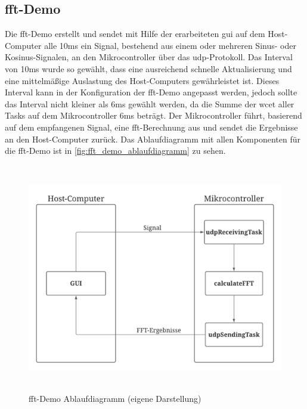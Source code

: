 \documentclass[../EDF Master Thesis.tex]{subfiles}
\begin{document}
    \clearpage

    \subsection{\acf{fft}-Demo} \label{section:fft_demo}

        Die \ac{fft}-Demo erstellt und sendet mit Hilfe der erarbeiteten \ac{gui} auf dem Host-Computer alle 10ms ein Signal, bestehend aus einem oder mehreren Sinus- oder Kosinus-Signalen, an den Mikrocontroller über das \ac{udp}-Protokoll.
        Das Interval von 10ms wurde so gewählt, dass eine ausreichend schnelle Aktualisierung und eine mittelmäßige Auslastung des Host-Computers gewährleistet ist.
        Dieses Interval kann in der Konfiguration der \ac{fft}-Demo angepasst werden, jedoch sollte das Interval nicht kleiner als 6ms gewählt werden, da die Summe der \ac{wcet} aller Tasks auf dem Mikrocontroller 6ms beträgt.
        Der Mikrocontroller führt, basierend auf dem empfangenen Signal, eine \ac{fft}-Berechnung aus und sendet die Ergebnisse an den Host-Computer zurück.
        Das Ablaufdiagramm mit allen Komponenten für die \ac{fft}-Demo ist in \autoref{fig:fft_demo_ablaufdiagramm} zu sehen.

        \begin{figure}[H]
            \centering
            \includegraphics[height=10cm, width=14cm]{./attachments/FFT Ablauf.pdf}
            \caption[\ac{fft}-Demo Ablaufdiagramm]{\ac{fft}-Demo Ablaufdiagramm (eigene Darstellung)}
            \label{fig:fft_demo_ablaufdiagramm}
        \end{figure}
\end{document}
